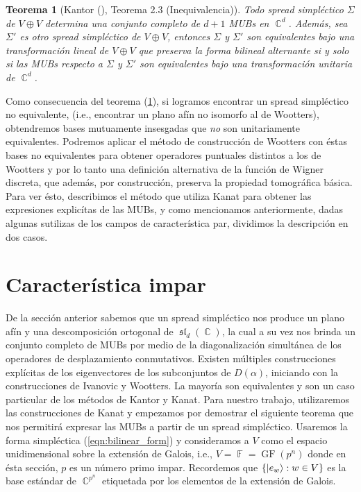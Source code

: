 \documentclass[a4paper]{report}
\DeclareMathOperator{\C}{\mathbb{C}}
\DeclareMathOperator{\F}{\mathbb{F}}
\DeclareMathOperator{\GF}{GF}
\DeclareMathOperator{\Sl}{\mathfrak{sl}}
\newtheorem{theorem}{Teorema}
\begin{document}
  \begin{theorem}[Kantor (\cite{kantor2012}), Teorema 2.3
    (Inequivalencia)]
    \label{thm:kantor_ineq}
    Todo spread simpléctico $\Sigma$ de $V \oplus V$
    determina una conjunto completo de $d+1$ MUBs en
    $\C^{d}$. Además, sea $\Sigma'$ es otro spread
    simpléctico de $V \oplus V$, entonces $\Sigma$ y
    $\Sigma'$ son equivalentes bajo una transformación
    lineal de $V \oplus V$ que preserva la forma bilineal
    alternante si y solo si las MUBs respecto a  $\Sigma$ y
    $\Sigma'$ son equivalentes bajo una transformación
    unitaria de $\C^{d}$.
  \end{theorem}

  Como consecuencia del teorema (\ref{thm:kantor_ineq}), si
  logramos encontrar un spread simpléctico no equivalente,
  (i.e., encontrar un plano afín no isomorfo al de
  Wootters), obtendremos bases mutuamente insesgadas que
  \textit{no} son unitariamente equivalentes. Podremos
  aplicar el método de construcción de Wootters con éstas
  bases no equivalentes para obtener operadores puntuales
  distintos a los de Wootters y por lo tanto una definición
  alternativa de la función de Wigner discreta, que además,
  por construcción, preserva la propiedad tomográfica
  básica. Para ver ésto, describimos el método que utiliza
  Kanat para obtener las expresiones explicítas de las
  MUBs, y como mencionamos anteriormente, dadas algunas
  sutilizas de los campos de característica par, dividimos
  la descripción en dos casos.
  
  \section{Característica impar}

  De la sección anterior sabemos que un spread simpléctico
  nos produce un plano afín y una descomposición ortogonal
  de $\Sl_d(\C)$, la cual a su vez nos brinda un conjunto
  completo de MUBs por medio de la diagonalización
  simultánea de los operadores de desplazamiento
  conmutativos. Existen múltiples construcciones explícitas
  de los eigenvectores de los subconjuntos de $D(\alpha)$,
  iniciando con la construcciones de Ivanovic y Wootters. La
  mayoría son equivalentes y son un caso particular de los
  métodos de Kantor y Kanat. Para nuestro trabajo,
  utilizaremos las construcciones de Kanat y empezamos por
  demostrar el siguiente teorema que nos permitirá expresar
  las MUBs a partir de un spread simpléctico. Usaremos la
  forma simpléctica (\ref{eqn:bilinear_form}) y consideramos
  a $V$ como el espacio unidimensional sobre la extensión de
  Galois, i.e., $V = \F = \GF(p^{n})$ donde en ésta sección,
  $p$ es un número primo impar.  Recordemos que $\{\ket{e_w}
  : w \in V\}$ es la base estándar de $\C^{p^{n}}$
  etiquetada por los elementos de la extensión de Galois.
\end{document}
